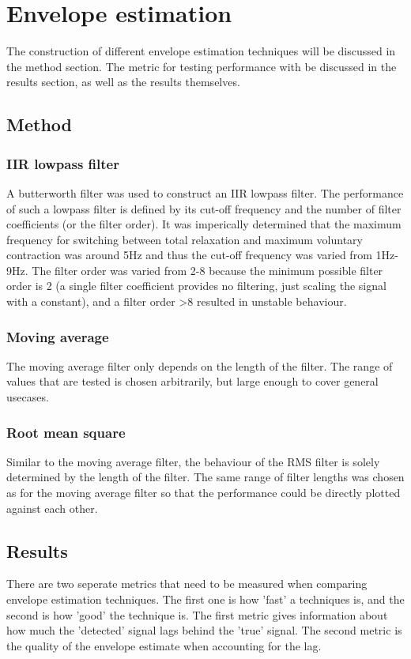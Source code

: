 \section{Envelope estimation}
The construction of different envelope estimation techniques will be discussed in the method section. The metric for testing performance with be discussed in the results section, as well as the results themselves.

\subsection{Method}
\subsubsection{IIR lowpass filter}
A butterworth filter was used to construct an IIR lowpass filter. The performance of such a lowpass filter is defined by its cut-off frequency and the number of filter coefficients (or the filter order). It was imperically determined that the maximum frequency for switching between total relaxation and maximum voluntary contraction was around 5Hz and thus the cut-off frequency was varied from 1Hz-9Hz. The filter order was varied from 2-8 because the minimum possible filter order is 2 (a single filter coefficient provides no filtering, just scaling the signal with a constant), and a filter order >8 resulted in unstable behaviour.

\subsubsection{Moving average}
The moving average filter only depends on the length of the filter. The range of values that are tested is chosen arbitrarily, but large enough to cover general usecases.

\subsubsection{Root mean square}
Similar to the moving average filter, the behaviour of the RMS filter is solely determined by the length of the filter. The same range of filter lengths was chosen as for the moving average filter so that the performance could be directly plotted against each other.

\subsection{Results}
There are two seperate metrics that need to be measured when comparing envelope estimation techniques. The first one is how 'fast' a techniques is, and the second is how 'good' the technique is. The first metric gives information about how much the 'detected' signal lags behind the 'true' signal. The second metric is the quality of the envelope estimate when accounting for the lag. 


